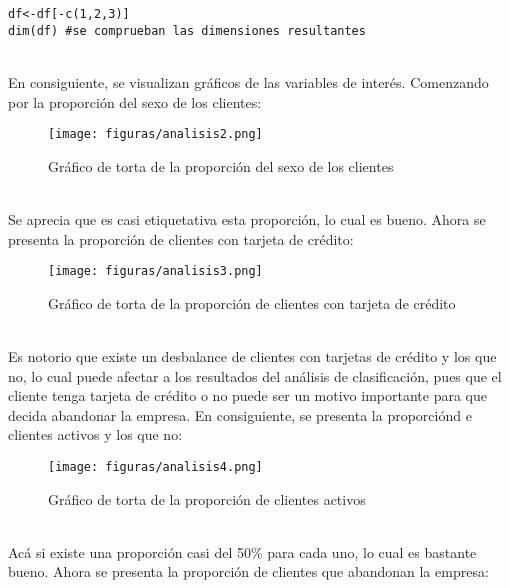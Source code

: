 \documentclass{report}
\begin{document}
\begin{lstlisting}[Language=R, caption={Eliminación de variables que no aportan información relevante},captionpos=b]
df<-df[-c(1,2,3)]
dim(df) #se comprueban las dimensiones resultantes
\end{lstlisting}\\


En consiguiente, se visualizan gráficos de las variables de interés. Comenzando por la proporción del sexo de los clientes:\\

 \begin{figure}[htp]
        \centering
    	\texttt{[image: figuras/analisis2.png]}
    	\label{fig: Figura1}
    	\caption{Gráfico de torta de la proporción del sexo de los clientes}
        \end{figure}\\

Se aprecia que es casi etiquetativa esta proporción, lo cual es bueno. Ahora se presenta la proporción de clientes con tarjeta de crédito:\\
\vspace{4cm}

\begin{figure}[htp]
        \centering
    	\texttt{[image: figuras/analisis3.png]}
    	\label{fig: Figura1}
    	\caption{Gráfico de torta de la proporción de clientes con tarjeta de crédito}
        \end{figure}\\

Es notorio que existe un desbalance de clientes con tarjetas de crédito y los que no, lo cual puede afectar a los resultados del análisis de clasificación, pues que el cliente tenga tarjeta de crédito o no puede ser un motivo importante para que decida abandonar la empresa. En consiguiente, se presenta la proporciónd e clientes activos y los que no:\\

\begin{figure}[htp]
        \centering
    	\texttt{[image: figuras/analisis4.png]}
    	\label{fig: Figura1}
    	\caption{Gráfico de torta de la proporción de clientes activos}
        \end{figure}\\

Acá si existe una proporción casi del 50\% para cada uno, lo cual es bastante bueno. Ahora se presenta la proporción de clientes que abandonan la empresa:\\
\vspace{6cm}
\end{document}
